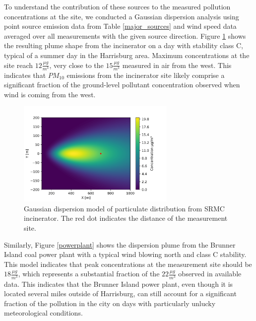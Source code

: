 \documentclass[11pt,journal]{IEEEtran}
\begin{document}

To understand the contribution of these sources to the measured pollution concentrations at the site, we conducted a Gaussian dispersion analysis using point source emission data from Table \ref{major_sources} and wind speed data averaged over all measurements with the given source direction. Figure \ref{incinerator} shows the resulting plume shape from the incinerator on a day with stability class C, typical of a summer day in the Harrisburg area. Maximum concentrations at the site reach $12 \frac{\mu g}{m^3}$, very close to the $15 \frac{\mu g}{m^3}$ measured in air from the west. This indicates that $PM_{10}$ emissions from the incinerator site likely comprise a significant fraction of the ground-level pollutant concentration observed when wind is coming from the west.

\begin{figure}[htbp]
\centering
\includegraphics[width=3in]{figs/incinerator_cloud}
\caption{Gaussian dispersion model of particulate distribution from SRMC incinerator. The red dot indicates the distance of the measurement site.}
\label{incinerator}
\end{figure}

Similarly, Figure \ref{powerplant} shows the dispersion plume from the Brunner Island coal power plant with a typical wind blowing north and class C stability. This model indicates that peak concentrations at the measurement site should be $18 \frac{\mu g}{m^3}$, which represents a substantial fraction of the $22 \frac{\mu g}{m^3}$ observed in available data. This indicates that the Brunner Island power plant, even though it is located several miles outside of Harrisburg, can still account for a significant fraction of the pollution in the city on days with particularly unlucky meteorological conditions.
\end{document}

